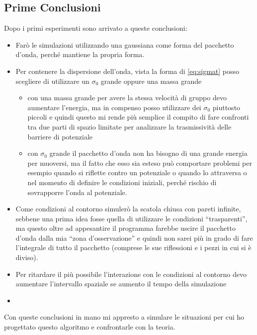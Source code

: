 \subsection{Prime Conclusioni}
Dopo i primi esperimenti sono arrivato a queste conclusioni:
\begin{itemize}
\item Far\`o le simulazioni utilizzando una gaussiana come forma del pacchetto d'onda, perch\'e mantiene la propria forma.
\item Per contenere la dispersione dell'onda, vista la forma di \eqref{eq:sigmat} posso scegliere di utilizzare un $\sigma_0$ grande oppure una massa grande
  \begin{itemize}
  \item con una massa grande per avere la stessa velocit\`a di gruppo devo aumentare l'energia, ma in compenso posso utilizzare dei $\sigma_0$ piuttosto piccoli e quindi questo mi rende pi\`u semplice il compito di fare confronti tra due parti di spazio limitate per analizzare la trasmissivit\`a delle barriere di potenziale
  \item con $\sigma_0$ grande il pacchetto d'onda  non ha bisogno di una grande energia per muoversi, ma il fatto che esso sia esteso pu\`o comportare problemi per esempio quando si riflette contro un potenziale o quando lo attraversa o nel momento di definire le condizioni iniziali, perch\'e rischio di sovrapporre l'onda al potenziale.
  \end{itemize}
\item Come condizioni al contorno simuler\`o la scatola chiusa con pareti infinite, sebbene una prima idea fosse quella di utilizzare le condizioni ``trasparenti'', ma questo oltre ad appesantire il programma farebbe uscire il pacchetto d'onda dalla mia ``zona d'osservazione'' e quindi non sarei pi\`u in grado di fare l'integrale di tutto il pacchetto (comprese le sue riflessioni e i pezzi in cui si \`e diviso).
\item Per ritardare il pi\`u possibile l'interazione con le condizioni al contorno devo aumentare l'intervallo spaziale se aumento il tempo della simulazione
\item %
\end{itemize}

Con queste conclusioni in mano mi appresto a simulare le situazioni per cui ho progettato questo algoritmo e confrontarle con la teoria.
